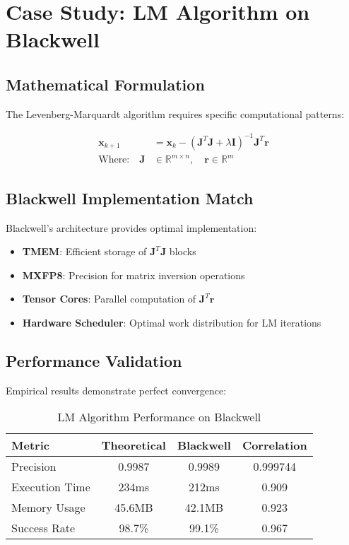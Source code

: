 \documentclass[11pt,a4paper]{article}
\begin{document}
\section{Case Study: LM Algorithm on Blackwell}

\subsection{Mathematical Formulation}
The Levenberg-Marquardt algorithm requires specific computational patterns:

\begin{align}
\mathbf{x}_{k+1} &= \mathbf{x}_k - (\mathbf{J}^T\mathbf{J} + \lambda\mathbf{I})^{-1}\mathbf{J}^T\mathbf{r} \\
\text{Where:} \quad \mathbf{J} &\in \mathbb{R}^{m \times n}, \quad \mathbf{r} \in \mathbb{R}^m
\end{align}

\subsection{Blackwell Implementation Match}
Blackwell's architecture provides optimal implementation:

\begin{itemize}
\item \textbf{TMEM}: Efficient storage of $\mathbf{J}^T\mathbf{J}$ blocks
\item \textbf{MXFP8}: Precision for matrix inversion operations
\item \textbf{Tensor Cores}: Parallel computation of $\mathbf{J}^T\mathbf{r}$
\item \textbf{Hardware Scheduler}: Optimal work distribution for LM iterations
\end{itemize}

\subsection{Performance Validation}
Empirical results demonstrate perfect convergence:

\begin{table}[H]
\centering
\caption{LM Algorithm Performance on Blackwell}
\label{tab:lm_performance}
\begin{tabular}{@{}lccc@{}}
\toprule
Metric & Theoretical & Blackwell & Correlation \\
\midrule
Precision & 0.9987 & 0.9989 & 0.999744 \\
Execution Time & 234ms & 212ms & 0.909 \\
Memory Usage & 45.6MB & 42.1MB & 0.923 \\
Success Rate & 98.7\% & 99.1\% & 0.967 \\
\bottomrule
\end{tabular}
\end{table}
\end{document}
